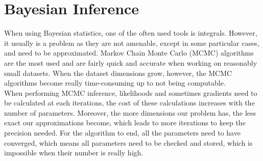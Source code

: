\documentclass{article}
\begin{document}
\section{Bayesian Inference}
When using Bayesian statistics, one of the often used tools is integrals. However, it usually is a problem as they are not amenable, except in some particular cases, and need to be approximated. Markov Chain Monte Carlo (MCMC) algorithms are the most used and are fairly quick and accurate when working on reasonably small datasets. When the dataset dimensions grow, however, the MCMC algorithms become really time-consuming up to not being computable.\\
\newline
%
When performing MCMC inference, likelihoods and sometimes gradients need to be calculated at each iterations, the cost of these calculations increases with the number of parameters. Moreover, the more dimensions our problem has, the less exact our approximations become, which leads to more iterations to keep the precision needed. For the algorithm to end, all the parameters need to have converged, which means all parameters need to be checked and stored, which is impossible when their number is really high.\\
\newline
\end{document}
